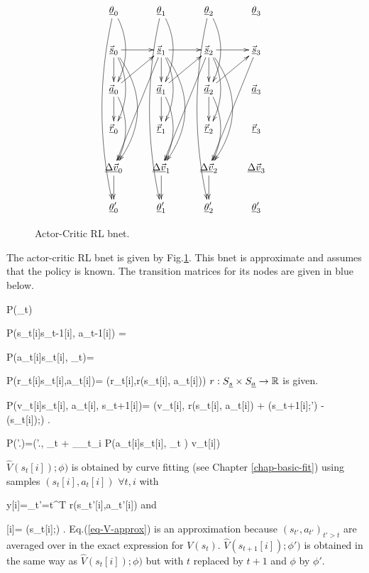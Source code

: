 \begin{figure}
\centering
$$\xymatrix{
\rvtheta_0\ar@/^1pc/[dd]\ar@/_1pc/[ddddd]&
\rvtheta_1\ar@/^1pc/[dd]\ar@/_1pc/[ddddd]&
\rvtheta_2\ar@/^1pc/[dd]\ar@/_1pc/[ddddd]&
\rvtheta_3\\
\vec{\rvs}_0\ar[r]\ar[d]\ar@/^1pc/[dd]
\ar@/^2pc/[ddd]&
\vec{\rvs}_1\ar[r]\ar[d]\ar@/^1pc/[dd]
\ar@/^2pc/[ddd]\ar[dddl]&
\vec{\rvs}_2\ar[r]\ar[d]\ar@/^1pc/[dd]
\ar@/^2pc/[ddd]\ar[dddl]&
\vec{\rvs}_3\ar[dddl]\\
\vec{\rva}_0\ar[d]\ar[ur]\ar@/^1pc/[dd]&
\vec{\rva}_1\ar[d]\ar[ur]\ar@/^1pc/[dd]&
\vec{\rva}_2\ar[d]\ar[ur]\ar@/^1pc/[dd]&
\vec{\rva}_3\\
\vec{\rvr}_0&
\vec{\rvr}_1&
\vec{\rvr}_2&
\vec{\rvr}_3\\
\ul{\Delta \vec{v}}_0\ar[d]&
\ul{\Delta \vec{v}}_1\ar[d]&
\ul{\Delta \vec{v}}_2\ar[d]&
\ul{\Delta \vec{v}}_3\\
\rvtheta'_0&
\rvtheta'_1&
\rvtheta'_2&
\rvtheta'_3
}$$
\caption{Actor-Critic RL bnet.  }
\label{fig-ac-rl}
\end{figure}
The actor-critic RL bnet
is given by Fig.\ref{fig-ac-rl}. This
bnet is approximate and assumes
that the policy is known. The
transition matrices for its nodes
are given in blue below.



\beq\color{blue}
P(\theta_t) 
\eeq

\beq\color{blue}
P(s_t[i]\cond s_{t-1}[i], a_{t-1}[i]) =  
\eeq

\beq\color{blue}
P(a_t[i]\cond s_t[i], \theta_t)= 
\eeq

\beq\color{blue}
P(r_t[i]\cond s_t[i],a_t[i])=
\delta(r_t[i],r(s_t[i], a_t[i]))
\eeq
$r:S_{\underline{s}}\times S_{\underline{a}}\rightarrow{ \mathbb{R}} $ is given.

\beq\color{blue}
P(\Delta v_t[i]\cond s_t[i], a_t[i], s_{t+1}[i])=
\delta(\Delta v_t[i], r(s_t[i], a_t[i]) +
\gamma {}(s_{t+1}[i];\phi')
- (s_t[i]);\phi)
\;.
\eeq

\beq\color{blue}
P(\theta'.)=\delta(\theta'.,
\theta_t +
\alpha \partial_{\theta_t}\sum_i
\ln P(a_t[i]\cond s_t[i], \theta_t )
\Delta v_t[i])
\eeq

$\hat{V}(s_t[i]);\phi)$ is
obtained by curve fitting
 (see Chapter \ref{chap-basic-fit})
using samples $(s_t[i], a_t[i])$ 
$\forall t,i$
with

\beq
 y[i]=\sum_{t'=t}^{T}
r(s_{t'}[i],a_{t'}[i])
\label{eq-V-approx}
\eeq
and 

\beq
{}[i]=
(s_t[i];\phi)
\;.
\eeq
Eq.(\ref{eq-V-approx}) 
is an approximation
because $(s_{t'}, a_{t'})_{t'>t}$ 
are averaged over in the exact
expression for $V(s_t)$.
$\hat{V}(s_{t+1}[i]);\phi')$ is
obtained in the same way as
$\hat{V}(s_t[i]);\phi)$
but with $t$ replaced by $t+1$
and $\phi$ by $\phi'$.

